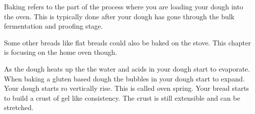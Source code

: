 Baking refers to the part of the process where you are loading
your dough into the oven. This is typically done after your
dough has gone through the bulk fermentation and proofing stage.

Some other breads like flat breads
could also be baked on the stove. This chapter is focusing on the
home oven though.

As the dough heats up the the water and acids
in your dough start to evaporate. When baking
a gluten based dough the bubbles in your dough start to expand.
Your dough starts ro vertically rise. This is called oven spring.
Your bread starts to build a crust of gel like consistency. The crust is still
extensible and can be stretched.

\begin{table}[!htb]
  \centering
\end{table}
